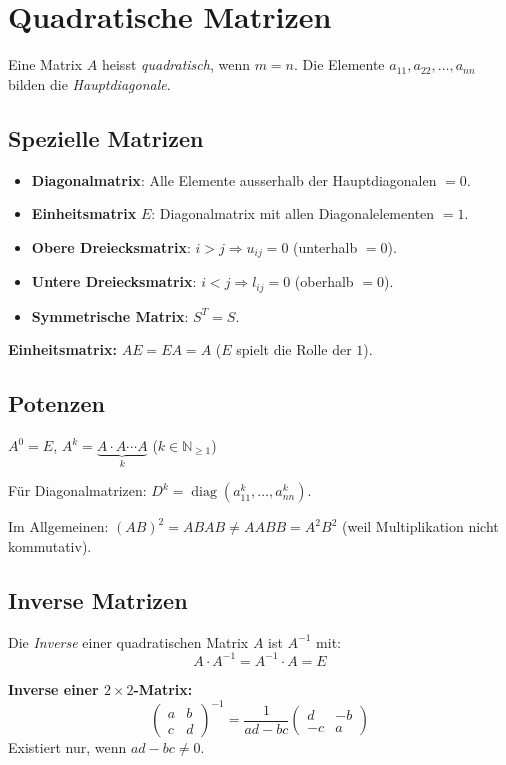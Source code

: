 \section{Quadratische Matrizen}

Eine Matrix $A$ heisst \emph{quadratisch}, wenn $m = n$. Die Elemente $a_{11}, a_{22}, \ldots, a_{nn}$ bilden die \emph{Hauptdiagonale}.

\subsection{Spezielle Matrizen}
\begin{itemize}
    \item \textbf{Diagonalmatrix}: Alle Elemente ausserhalb der Hauptdiagonalen $= 0$.
    \item \textbf{Einheitsmatrix} $E$: Diagonalmatrix mit allen Diagonalelementen $= 1$.
    \item \textbf{Obere Dreiecksmatrix}: $i > j \Rightarrow u_{ij} = 0$ (unterhalb $= 0$).
    \item \textbf{Untere Dreiecksmatrix}: $i < j \Rightarrow l_{ij} = 0$ (oberhalb $= 0$).
    \item \textbf{Symmetrische Matrix}: $S^T = S$.
\end{itemize}

\textbf{Einheitsmatrix:} $AE = EA = A$ \quad ($E$ spielt die Rolle der $1$).

\subsection{Potenzen}
$A^0 = E$, \quad $A^k = \underbrace{A \cdot A \cdots A}_{k}$ \quad ($k \in \mathbb{N}_{\ge 1}$)

Für Diagonalmatrizen: $D^k = \operatorname{diag}(a_{11}^k, \ldots, a_{nn}^k)$.

Im Allgemeinen: $(AB)^2 = ABAB \neq AABB = A^2B^2$ (weil Multiplikation nicht kommutativ).

\subsection{Inverse Matrizen}

Die \emph{Inverse} einer quadratischen Matrix $A$ ist $A^{-1}$ mit:
\[
    A \cdot A^{-1} = A^{-1} \cdot A = E
\]

\textbf{Inverse einer $2 \times 2$-Matrix:}
\[
    \begin{pmatrix} a & b \\ c & d \end{pmatrix}^{-1}
    = \frac{1}{ad - bc} \begin{pmatrix} d & -b \\ -c & a \end{pmatrix}
\]
Existiert nur, wenn $ad - bc \neq 0$.


